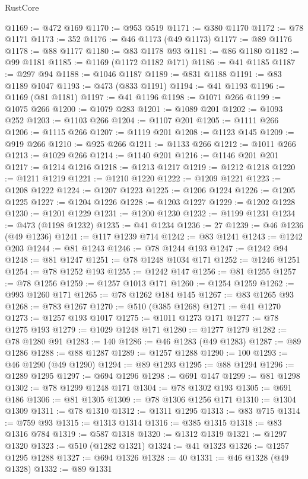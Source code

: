 \begin{lexlean}{RustCore}
\begin{coremodule}
@1169 := @472 @169
@1170 := @953 @519
@1171 := @380 @1170
@1172 := @78 @1171
@1173 := 352
@1176 := @46 @1173 (@49 @1173)
@1177 := @89 @1176
@1178 := @88 @1177
@1180 := @83 @1178 @93
@1181 := @86 @1180
@1182 := @99 @1181
@1185 := @1169 (@1172 @1182 @171)
@1186 := @41 @1185
@1187 := @297 @94
@1188 := @1046 @1187
@1189 := @831 @1188
@1191 := @83 @1189 @1047
@1193 := @473 (@833 @1191)
@1194 := @41 @1193
@1196 := @1169 (@81 @1181)
@1197 := @41 @1196
@1198 := @1071 @266
@1199 := @1075 @266
@1200 := @1079 @283
@1201 := @1089 @201
@1202 := @1093 @252
@1203 := @1103 @266
@1204 := @1107 @201
@1205 := @1111 @266
@1206 := @1115 @266
@1207 := @1119 @201
@1208 := @1123 @145
@1209 := @919 @266
@1210 := @925 @266
@1211 := @1133 @266
@1212 := @1011 @266
@1213 := @1029 @266
@1214 := @1140 @201
@1216 := @1146 @201 @201
@1217 := @1214 @1216
@1218 := @1213 @1217
@1219 := @1212 @1218
@1220 := @1211 @1219
@1221 := @1210 @1220
@1222 := @1209 @1221
@1223 := @1208 @1222
@1224 := @1207 @1223
@1225 := @1206 @1224
@1226 := @1205 @1225
@1227 := @1204 @1226
@1228 := @1203 @1227
@1229 := @1202 @1228
@1230 := @1201 @1229
@1231 := @1200 @1230
@1232 := @1199 @1231
@1234 := @473 (@1198 @1232)
@1235 := @41 @1234
@1236 := 27
@1239 := @46 @1236 (@49 @1236)
@1241 := @117 @1239 @714
@1242 := @83 @1241
@1243 := @1242 @203
@1244 := @81 @1243
@1246 := @78 @1244 @193
@1247 := @1242 @94
@1248 := @81 @1247
@1251 := @78 @1248 @1034 @171
@1252 := @1246 @1251
@1254 := @78 @1252 @193
@1255 := @1242 @147
@1256 := @81 @1255
@1257 := @78 @1256
@1259 := @1257 @1013 @171
@1260 := @1254 @1259
@1262 := @993 @1260 @171
@1265 := @78 @1262 @184 @145
@1267 := @83 @1265 @93
@1268 := @783 @1267
@1270 := @510 (@385 @1268)
@1271 := @41 @1270
@1273 := @1257 @193 @1017
@1275 := @1011 @1273 @171
@1277 := @78 @1275 @193
@1279 := @1029 @1248 @171
@1280 := @1277 @1279
@1282 := @78 @1280 @91
@1283 := 140
@1286 := @46 @1283 (@49 @1283)
@1287 := @89 @1286
@1288 := @88 @1287
@1289 := @1257 @1288
@1290 := 100
@1293 := @46 @1290 (@49 @1290)
@1294 := @89 @1293
@1295 := @88 @1294
@1296 := @1289 @1295
@1297 := @694 @1296
@1298 := @691 @147
@1299 := @81 @1298
@1302 := @78 @1299 @1248 @171
@1304 := @78 @1302 @193
@1305 := @691 @186
@1306 := @81 @1305
@1309 := @78 @1306 @1256 @171
@1310 := @1304 @1309
@1311 := @78 @1310
@1312 := @1311 @1295
@1313 := @83 @715
@1314 := @759 @93
@1315 := @1313 @1314
@1316 := @385 @1315
@1318 := @83 @1316 @784
@1319 := @587 @1318
@1320 := @1312 @1319
@1321 := @1297 @1320
@1323 := @510 (@1282 @1321)
@1324 := @41 @1323
@1326 := @1257 @1295 @1288
@1327 := @694 @1326
@1328 := 40
@1331 := @46 @1328 (@49 @1328)
@1332 := @89 @1331

\end{coremodule}
\end{lexlean}
